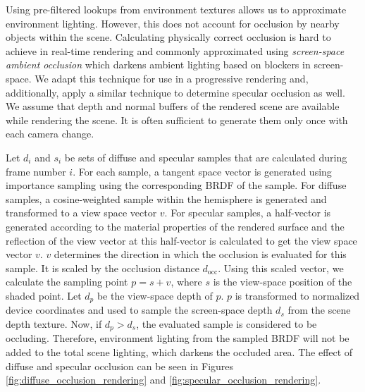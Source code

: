\documentclass[sigconf,authorversion]{acmart}
\begin{document}
Using pre-filtered lookups from environment textures allows us to approximate environment lighting.
However, this does not account for occlusion by nearby objects within the scene.
Calculating physically correct occlusion is hard to achieve in real-time rendering and commonly approximated using \textit{screen-space ambient occlusion} which darkens ambient lighting based on blockers in screen-space.
We adapt this technique for use in a progressive rendering and, additionally, apply a similar technique to determine specular occlusion as well.
We assume that depth and normal buffers of the rendered scene are available while rendering the scene.
It is often sufficient to generate them only once with each camera change.

Let $d_i$ and $s_i$ be sets of diffuse and specular samples that are calculated during frame number $i$.
For each sample, a tangent space vector is generated using importance sampling using the corresponding BRDF of the sample.
For diffuse samples, a cosine-weighted sample within the hemisphere is generated and transformed to a view space vector $v$.
For specular samples, a half-vector is generated according to the material properties of the rendered surface and the reflection of the view vector at this half-vector is calculated to get the view space vector $v$.
$v$ determines the direction in which the occlusion is evaluated for this sample.
It is scaled by the occlusion distance $d_\text{occ}$.
Using this scaled vector, we calculate the sampling point $p = s + v$, where $s$ is the view-space position of the shaded point.
Let $d_p$ be the view-space depth of $p$.
$p$ is transformed to normalized device coordinates and used to sample the screen-space depth $d_s$ from the scene depth texture.
Now, if $d_p > d_s$, the evaluated sample is considered to be occluding.
Therefore, environment lighting from the sampled BRDF will not be added to the total scene lighting, which darkens the occluded area.
The effect of diffuse and specular occlusion can be seen in Figures \ref{fig:diffuse_occlusion_rendering} and \ref{fig:specular_occlusion_rendering}.
\end{document}
